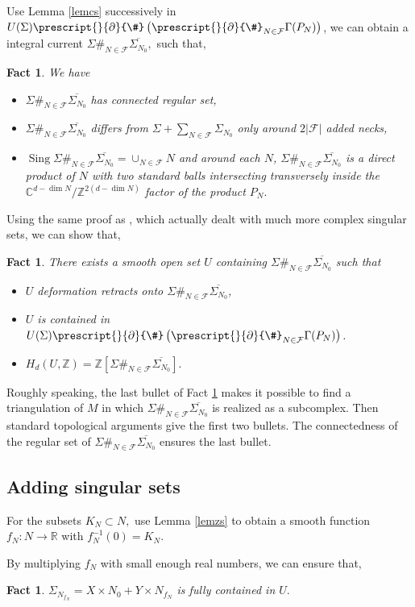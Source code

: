 \documentclass[11pt,a4paper]{amsart}
\numberwithin{equation}{section}
\newcommand{\sing}{{\operatorname{Sing}}}
\newcommand{\Ga}{\Gamma}
\newcommand{\Si}{\Sigma}
\newcommand{\bcs}{\prescript{}{\pd}{\#}}
\newcommand{\s}{\subset}
\newcommand{\ov}[1]{\overline{#1}}
\newcommand{\m}{^{-1}}
\newcommand{\pd}{\partial}
\newcommand{\R}{\mathbb{R}}
\newcommand{\Z}{\mathbb{Z}}
\newcommand{\C}{\mathbb{C}}
\theoremstyle{plain}
\newtheorem{fact}[exam]{Fact}
\theoremstyle{definition}
\numberwithin{equation}{subsection}
\begin{document}
	Use Lemma \ref{lemcs} successively in $U(\Si)\bcs\left(\prescript{}{\pd}{\#}_{N\in\mathcal{F}}\Ga(P_N)\right)$, we can obtain a integral current $\Si\#_{N\in\mathcal{F}}\ov{\Si_{N_0}},$ such that,
	\begin{fact}\label{fctsi}We have
		\begin{itemize}
			\item $\Si\#_{N\in\mathcal{F}}\ov{\Si_{N_0}}$ has connected regular set,
			\item $\Si\#_{N\in\mathcal{F}}\ov{\Si_{N_0}}$ differs from $\Si+\sum_{N\in\mathcal{F}}{\Si_{N_0}}$ only around $2|\mathcal{F}|$ added necks,
			\item $\sing\Si\#_{N\in\mathcal{F}}\ov{\Si_{N_0}}=\cup_{N\in\mathcal{F}}N$ and around each $N$, $\Si\#_{N\in\mathcal{F}}\ov{\Si_{N_0}}$ is a direct product of $N$ with two standard balls intersecting transversely inside the $\C^{d-\dim N}/\Z^{2(d-\dim N)}$ factor of the product $P_N.$
		\end{itemize} 
	\end{fact}
	Using the same proof as \cite[Lemma 5.0.1]{ZLns}, which actually dealt with much more complex singular sets, we can show that,
	\begin{fact}\label{fctu}
		There exists a smooth open set $U$ containing $\Si\#_{N\in\mathcal{F}}\ov{\Si_{N_0}}$ such that
		\begin{itemize}
			\item $U$ deformation retracts onto $\Si\#_{N\in\mathcal{F}}\ov{\Si_{N_0}}$,
			\item $U$ is contained in $U(\Si)\bcs\left(\prescript{}{\pd}{\#}_{N\in\mathcal{F}}\Ga(P_N)\right)$.
			\item $H_d(U,\Z)=\Z[\Si\#_{N\in\mathcal{F}}\ov{\Si_{N_0}}].$
		\end{itemize}
	\end{fact}
	Roughly speaking, the last bullet of Fact \ref{fctsi} makes it possible to find a triangulation of $M$ in which $\Si\#_{N\in\mathcal{F}}\ov{\Si_{N_0}}$ is realized as a subcomplex. Then standard topological arguments give the first two bullets. The connectedness of the regular set of $\Si\#_{N\in\mathcal{F}}\ov{\Si_{N_0}}$ ensures the last bullet. 
	\subsection{Adding singular sets}
	For the subsets $K_N\s N,$ use Lemma \ref{lemzs} to obtain a smooth function $f_N:N\to \R$ with $f_N\m(0)=K_N.$
	
	By multiplying $f_N$ with small enough real numbers, we can ensure that,
	\begin{fact}\label{factuu}
		$\Si_{N_{f_N}}=X\times N_0+Y\times N_{f_N}$	is fully contained in $U.$
	\end{fact}
	
\end{document}
